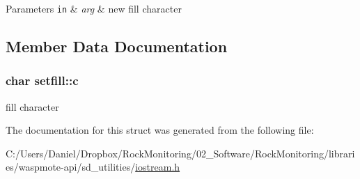 \begin{DoxyParams}[1]{Parameters}
\mbox{\tt in}  & {\em arg} & new fill character \\
\hline
\end{DoxyParams}


\subsection{Member Data Documentation}
\subsubsection[{\texorpdfstring{c}{c}}]{\setlength{\rightskip}{0pt plus 5cm}char setfill\+::c}\hypertarget{structsetfill_a42ffb4e6135c1274ae827cfed7793a82}{}\label{structsetfill_a42ffb4e6135c1274ae827cfed7793a82}
fill character 

The documentation for this struct was generated from the following file\+:\begin{DoxyCompactItemize}
\item 
C\+:/\+Users/\+Daniel/\+Dropbox/\+Rock\+Monitoring/02\+\_\+\+Software/\+Rock\+Monitoring/libraries/waspmote-\/api/sd\+\_\+utilities/\hyperlink{iostream_8h}{iostream.\+h}\end{DoxyCompactItemize}
